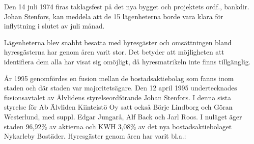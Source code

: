 Den 14 juli 1974 firas taklagsfest på det nya bygget och projektets ordf., bankdir. Johan Stenfors, kan meddela att de 15 lägenheterna borde vara klara för inflyttning i slutet av juli månad.

Lägenheterna blev snabbt besatta med hyresgäster och omsättningen bland hyresgästerna har genom åren varit stor. Det betyder att möjligheten att identifiera dem alla har visat sig omöjligt, då hyresmatrikeln inte finns tillgänglig.

År 1995 genomfördes en fusion mellan de bostadsaktiebolag som fanns inom staden och där staden var majoritetsägare. Den 12 april 1995 undertecknades fusionsavtalet av Älvlidens styrelseordförande Johan Stenfors. I denna sista styrelse för Ab Älvliden Kiinteistö Oy satt också Börje Lindborg och Göran Westerlund, med suppl. Edgar Jungarå, Alf Back och Jarl Roos. I nuläget äger staden 96,92\% av aktierna och KWH 3,08\% av det nya bostadsaktiebolaget Nykarleby Bostäder.
Hyresgäster genom åren har varit bl.a.:

